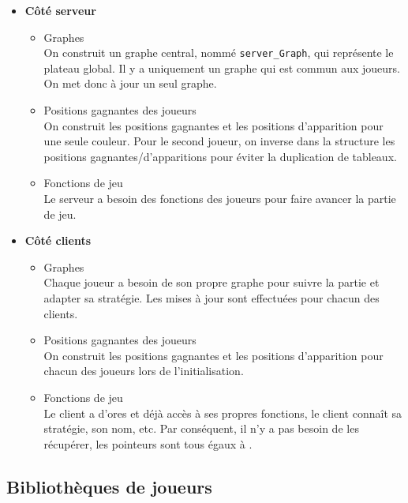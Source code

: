 \documentclass[a4paper]{article}
\begin{document}
\begin{itemize}
    \item \textbf{Côté serveur}
    \begin{itemize}
        \item Graphes \\
On construit un graphe central, nommé \texttt{server\_Graph}, qui représente le plateau global. Il y a uniquement un graphe qui est commun aux joueurs. On met donc à jour un seul graphe.\\
        \item Positions gagnantes des joueurs \\
On construit les positions gagnantes et les positions d'apparition pour une seule couleur. Pour le second joueur, on inverse dans la structure les positions gagnantes/d'apparitions pour éviter la duplication de tableaux. \\
        \item Fonctions de jeu \\
Le serveur a besoin des fonctions des joueurs pour faire avancer la partie de jeu. \\
    \end{itemize}
    
    \item \textbf{Côté clients}
    \begin{itemize}
        \item Graphes \\
Chaque joueur a besoin de son propre graphe pour suivre la partie et adapter sa stratégie. Les mises à jour sont effectuées pour chacun des clients. \\
        \item Positions gagnantes des joueurs \\
On construit les positions gagnantes et les positions d'apparition pour chacun des joueurs lors de l'initialisation. \\
        \item Fonctions de jeu \\
Le client a d'ores et déjà accès à ses propres fonctions, le client connaît sa stratégie, son nom, etc. Par conséquent, il n'y a pas besoin de les récupérer, les pointeurs sont tous égaux à . \\
    \end{itemize}
\end{itemize}

\subsection{Bibliothèques de joueurs}
\end{document}
